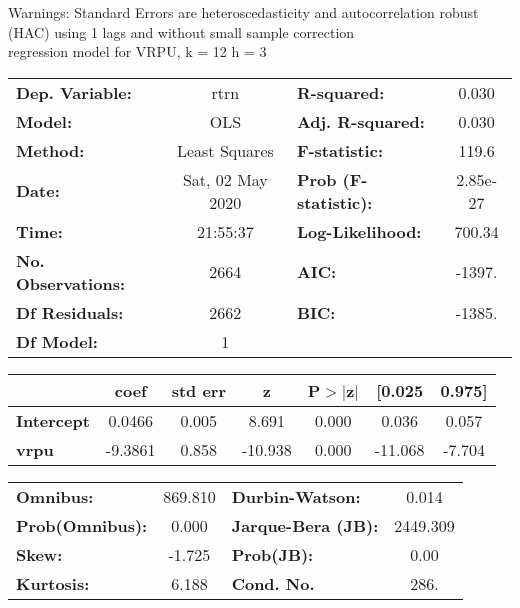 Warnings: \newline
 [1] Standard Errors are heteroscedasticity and autocorrelation robust (HAC) using 1 lags and without small sample correction\\ 

regression model for VRPU, k = 12 h = 3\begin{center}
\begin{tabular}{lclc}
\toprule
\textbf{Dep. Variable:}    &       rtrn       & \textbf{  R-squared:         } &     0.030   \\
\textbf{Model:}            &       OLS        & \textbf{  Adj. R-squared:    } &     0.030   \\
\textbf{Method:}           &  Least Squares   & \textbf{  F-statistic:       } &     119.6   \\
\textbf{Date:}             & Sat, 02 May 2020 & \textbf{  Prob (F-statistic):} &  2.85e-27   \\
\textbf{Time:}             &     21:55:37     & \textbf{  Log-Likelihood:    } &    700.34   \\
\textbf{No. Observations:} &        2664      & \textbf{  AIC:               } &    -1397.   \\
\textbf{Df Residuals:}     &        2662      & \textbf{  BIC:               } &    -1385.   \\
\textbf{Df Model:}         &           1      & \textbf{                     } &             \\
\bottomrule
\end{tabular}
\begin{tabular}{lcccccc}
                   & \textbf{coef} & \textbf{std err} & \textbf{z} & \textbf{P$> |$z$|$} & \textbf{[0.025} & \textbf{0.975]}  \\
\midrule
\textbf{Intercept} &       0.0466  &        0.005     &     8.691  &         0.000        &        0.036    &        0.057     \\
\textbf{vrpu}      &      -9.3861  &        0.858     &   -10.938  &         0.000        &      -11.068    &       -7.704     \\
\bottomrule
\end{tabular}
\begin{tabular}{lclc}
\textbf{Omnibus:}       & 869.810 & \textbf{  Durbin-Watson:     } &    0.014  \\
\textbf{Prob(Omnibus):} &   0.000 & \textbf{  Jarque-Bera (JB):  } & 2449.309  \\
\textbf{Skew:}          &  -1.725 & \textbf{  Prob(JB):          } &     0.00  \\
\textbf{Kurtosis:}      &   6.188 & \textbf{  Cond. No.          } &     286.  \\
\bottomrule
\end{tabular}
\end{center}

